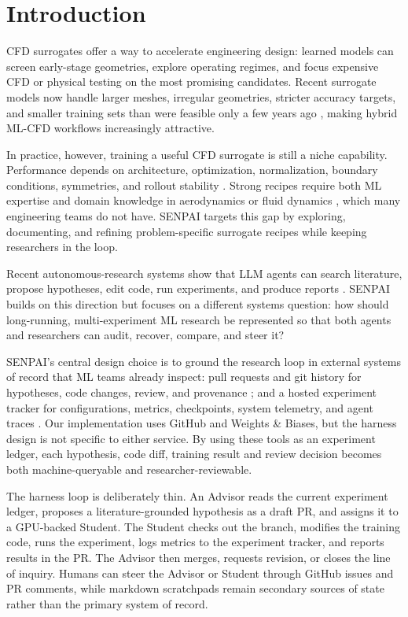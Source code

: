 \documentclass{article}
\begin{document}
\section{Introduction}

CFD surrogates offer a way to accelerate engineering design: learned models can screen early-stage geometries, explore operating regimes, and focus expensive CFD or physical testing on the most promising candidates. Recent surrogate models now handle larger meshes, irregular geometries, stricter accuracy targets, and smaller training sets than were feasible only a few years ago \citep{zhou2026transolver3}, making hybrid ML-CFD workflows increasingly attractive.

In practice, however, training a useful CFD surrogate is still a niche capability. Performance depends on architecture, optimization, normalization, boundary conditions, symmetries, and rollout stability \citep{wang2024cfdmlsurvey}. Strong recipes require both ML expertise and domain knowledge in aerodynamics or fluid dynamics \citep{hodges2024cfdmlmonograph}, which many engineering teams do not have. SENPAI targets this gap by exploring, documenting, and refining problem-specific surrogate recipes while keeping researchers in the loop.

Recent autonomous-research systems show that LLM agents can search literature, propose hypotheses, edit code, run experiments, and produce reports \citep{lu2024aiscientist,schmidgall2025agentlaboratory,yamada2025aiscientistv2,miyai2026jraiscientist}. SENPAI builds on this direction but focuses on a different systems question: how should long-running, multi-experiment ML research be represented so that both agents and researchers can audit, recover, compare, and steer it?

SENPAI's central design choice is to ground the research loop in external systems of record that ML teams already inspect: pull requests and git history for hypotheses, code changes, review, and provenance \citep{githubdocs_pullrequests,chacon2014progit}; and a hosted experiment tracker for configurations, metrics, checkpoints, system telemetry, and agent traces \citep{biewald2020wandb,wandbdocs_experiments}. Our implementation uses GitHub and Weights \& Biases, but the harness design is not specific to either service. By using these tools as an experiment ledger, each hypothesis, code diff, training result and review decision becomes both machine-queryable and researcher-reviewable.

The harness loop is deliberately thin. An Advisor reads the current experiment ledger, proposes a literature-grounded hypothesis as a draft PR, and assigns it to a GPU-backed Student. The Student checks out the branch, modifies the training code, runs the experiment, logs metrics to the experiment tracker, and reports results in the PR. The Advisor then merges, requests revision, or closes the line of inquiry. Humans can steer the Advisor or Student through GitHub issues and PR comments, while markdown scratchpads remain secondary sources of state rather than the primary system of record.
\end{document}

